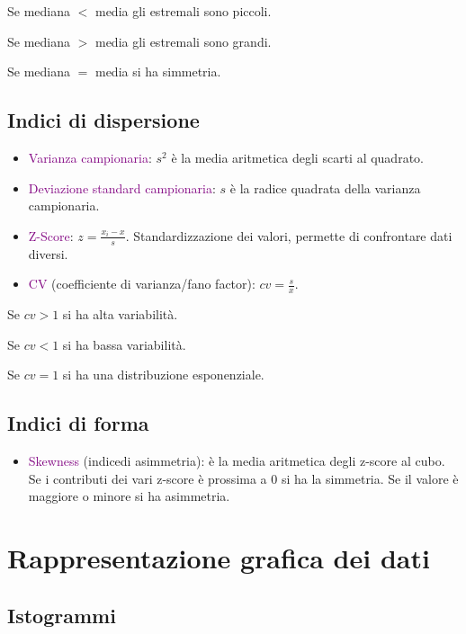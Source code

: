 Se mediana $<$ media gli estremali sono piccoli.

Se mediana $>$ media gli estremali sono grandi.

Se mediana $=$ media si ha simmetria.

\subsection{Indici di dispersione}

\begin{itemize}
    \item \textcolor{purple}{Varianza campionaria}: $s^2$ è la media aritmetica degli scarti al quadrato.
    \item \textcolor{purple}{Deviazione standard campionaria}: $s$ è la radice quadrata della varianza campionaria.
    \item \textcolor{purple}{Z-Score}: $z = \frac{x_i - x}{s}$. Standardizzazione dei valori, permette di confrontare dati diversi.
    \item \textcolor{purple}{CV} (coefficiente di varianza/fano factor): $cv = \frac{s}{x}$.
\end{itemize}

Se $cv > 1$ si ha alta variabilità. 

Se $cv < 1$ si ha bassa variabilità. 

Se $cv = 1$ si ha una distribuzione esponenziale. 

\subsection{Indici di forma}

\begin{itemize}
    \item \textcolor{purple}{Skewness} (indicedi asimmetria): è la media aritmetica degli z-score al cubo. Se i contributi dei vari z-score è prossima a 0 si ha la simmetria. Se il valore è maggiore o minore si ha asimmetria. 
\end{itemize}

\section{Rappresentazione grafica dei dati}

\subsection{Istogrammi}

